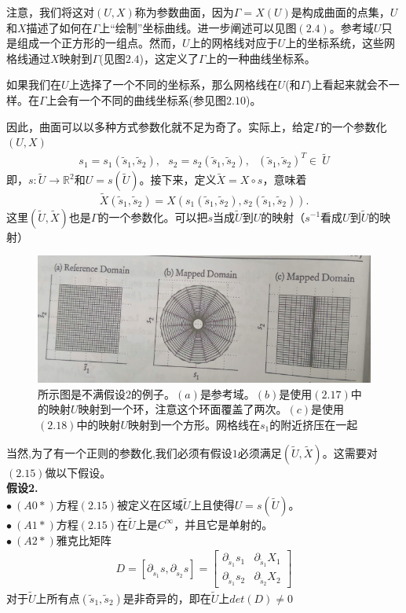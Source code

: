 注意，我们将这对$(U,X)$称为参数曲面，因为$\Gamma=X(U)$是构成曲面的点集，$U$和$X$描述了如何在$\Gamma$上“绘制”坐标曲线。进一步阐述可以见图$(2.4)$。参考域$U$只是组成一个正方形的一组点。然而，$U$上的网格线对应于$U$上的坐标系统，这些网格线通过$X$映射到$\Gamma$(见图$2.4$)，这定义了$\Gamma$上的一种曲线坐标系。

如果我们在$U$上选择了一个不同的坐标系，那么网格线在$U$(和$\Gamma$)上看起来就会不一样。在$\Gamma$上会有一个不同的曲线坐标系(参见图$2.10$)。

因此，曲面可以以多种方式参数化就不足为奇了。实际上，给定$\Gamma$的一个参数化$(U,X)$
\begin{gather}
s_1=s_1(\tilde{s}_1,\tilde{s}_2),~~~s_2=s_2(\tilde{s}_1,\tilde{s}_2),~~~(\tilde{s}_1,\tilde{s}_2)^T \in ~\tilde{U}
\end{gather}
即，$s:\tilde{U} \rightarrow \mathbb{R}^2$和$U=s(\tilde{U})$。接下来，定义$\tilde{X}=X\circ s$，意味着
$$\tilde{X}(\tilde{s}_1,\tilde{s}_2)=X(s_1(\tilde{s}_1,\tilde{s}_2),s_2(\tilde{s}_1,\tilde{s}_2)).$$
这里$(\tilde{U},\tilde{X})$也是$\Gamma$的一个参数化。可以把$s$当成$\tilde{U}$到$U$的映射（$s^{-1}$看成$U$到$\tilde{U}$的映射）
\begin{figure}[H]
\centering
\includegraphics[scale=0.5]{./figures/26.png}
\caption{所示图是不满假设$2$的例子。$(a)$是参考域。$(b)$是使用$(2.17)$中的映射$U$映射到一个环，注意这个环面覆盖了两次。$(c)$是使用$(2.18)$中的映射$U$映射到一个方形。网格线在$s_1$的附近挤压在一起}
\end{figure}

当然,为了有一个正则的参数化,我们必须有假设$1$必须满足$(\tilde{U},\tilde{X})$。这需要对$(2.15)$做以下假设。\\
\textbf{假设2.}\\
$\bullet~(A0*)$方程$(2.15)$被定义在区域$\tilde{U}$上且使得$U=s(\tilde{U})$。\\
$\bullet~(A1*)$方程$(2.15)$在$\tilde{U}$上是$C^{\infty}$，并且它是单射的。\\
$\bullet~(A2*)$雅克比矩阵
\begin{gather}
D=\left[ \partial _{\tilde{s}_1}s,\partial _{\tilde{s}_2}s \right]=
\begin{bmatrix}
\partial _{\tilde{s}_1}s_1  & \partial _{\tilde{s}_1}X_1 \\
\partial _{\tilde{s}_1}s_2  & \partial _{\tilde{s}_2}X_2 
\end{bmatrix}
\end{gather}
对于$\tilde{U}$上所有点$(\tilde{s}_1,\tilde{s}_2)$是非奇异的，即在$\tilde{U}$上$det(D)\neq 0$

